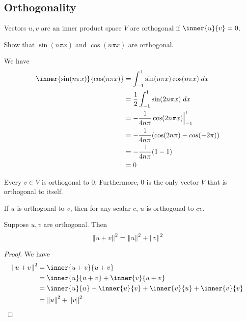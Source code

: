 \documentclass{article}
\begin{document}
\subsection{Orthogonality}
\begin{definition}
  Vectors $u, v$ are an inner product space $V$ are orthogonal if $\inner{u}{v} = 0$.
\end{definition}
\begin{example}
  Show that $\sin (n\pi x)$ and $\cos (n\pi x)$ are orthogonal.

  We have
  \begin{align*}
    \inner{\sin (n\pi x)}{\cos (n\pi x)} & = \int_{-1}^1 \sin (n\pi x) \cos (n\pi x) \; dx \\
                                         & = \frac{1}{2}\int_{-1}^1 \sin(2n\pi x) \; dx    \\
                                         & = -\frac{1}{4n\pi}\cos(2n\pi x)\Big|_{-1}^1     \\
                                         & = -\frac{1}{4n\pi}(\cos(2n\pi) - cos(-2\pi))    \\
                                         & = -\frac{1}{4n\pi}(1-1)                         \\
                                         & = 0
  \end{align*}
\end{example}
\begin{theorem}
  Every $v \in V$ is orthogonal to $0$. Furthermore, $0$ is the only vector $V$ that is orthogonal to itself.
\end{theorem}
\begin{theorem}
  If $u$ is orthogonal to $v$, then for any scalar $c$, $u$ is orthogonal to $cv$.
\end{theorem}
\begin{theorem}
  Suppose $u, v$ are orthogonal. Then \[
    \norm{u + v}^2 = \norm{u}^2 + \norm{v}^2
  \]
\end{theorem}
\begin{proof}
  We have
  \begin{align*}
    \norm{u+v}^2 & = \inner{u+v}{u+v}                                          \\
                 & = \inner{u}{u+v} + \inner{v}{u+v}                           \\
                 & = \inner{u}{u} + \inner{u}{v} + \inner{v}{u} + \inner{v}{v} \\
                 & = \norm{u}^2 + \norm{v}^2
  \end{align*}
\end{proof}
\end{document}
